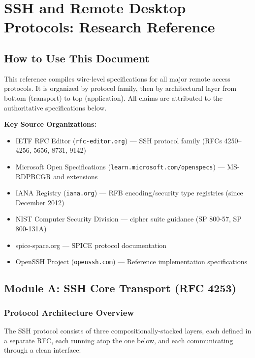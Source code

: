 \documentclass[11pt,letterpaper]{article}
\newcommand{\stageheader}[2]{%
  \noindent\colorbox{#2}{\makebox[\textwidth][l]{%
    \textcolor{white}{\bfseries\sffamily\hspace{6pt}#1\hspace{6pt}}}}%
  \vspace{0.5em}\par%
}
\begin{document}
\newpage
\stageheader{STAGE 2 --- RESEARCH REFERENCE}{secondary}

\section{SSH and Remote Desktop Protocols: Research Reference}

\subsection{How to Use This Document}

This reference compiles wire-level specifications for all major remote access protocols. It is organized by protocol family, then by architectural layer from bottom (transport) to top (application). All claims are attributed to the authoritative specifications below.

\textbf{Key Source Organizations:}
\begin{itemize}
\item IETF RFC Editor (\texttt{rfc-editor.org}) --- SSH protocol family (RFCs 4250--4256, 5656, 8731, 9142)
\item Microsoft Open Specifications (\texttt{learn.microsoft.com/openspecs}) --- MS-RDPBCGR and extensions
\item IANA Registry (\texttt{iana.org}) --- RFB encoding/security type registries (since December 2012)
\item NIST Computer Security Division --- cipher suite guidance (SP 800-57, SP 800-131A)
\item spice-space.org --- SPICE protocol documentation
\item OpenSSH Project (\texttt{openssh.com}) --- Reference implementation specifications
\end{itemize}

\subsection{Module A: SSH Core Transport (RFC 4253)}

\subsubsection{Protocol Architecture Overview}

The SSH protocol consists of three compositionally-stacked layers, each defined in a separate RFC, each running atop the one below, and each communicating through a clean interface:
\end{document}
